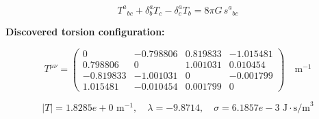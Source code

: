 
\begin{equation}
  T^a{}_{bc} + \delta^a_b T_c - \delta^a_c T_b = 8\pi G \, s^a{}_{bc}
\end{equation}

\textbf{Discovered torsion configuration:}

\begin{equation}
  T^{\mu\nu} = \begin{pmatrix}
    0 & -0.798806 & 0.819833 & -1.015481 \\
    0.798806 & 0 & 1.001031 & 0.010454 \\
    -0.819833 & -1.001031 & 0 & -0.001799 \\
    1.015481 & -0.010454 & 0.001799 & 0
  \end{pmatrix} \quad \text{m}^{-1}
\end{equation}

\begin{equation}
  |T| = 1.8285e+0 \text{ m}^{-1}, \quad
  \lambda = -9.8714, \quad
  \sigma = 6.1857e-3 \text{ J}\cdot\text{s/m}^3
\end{equation}